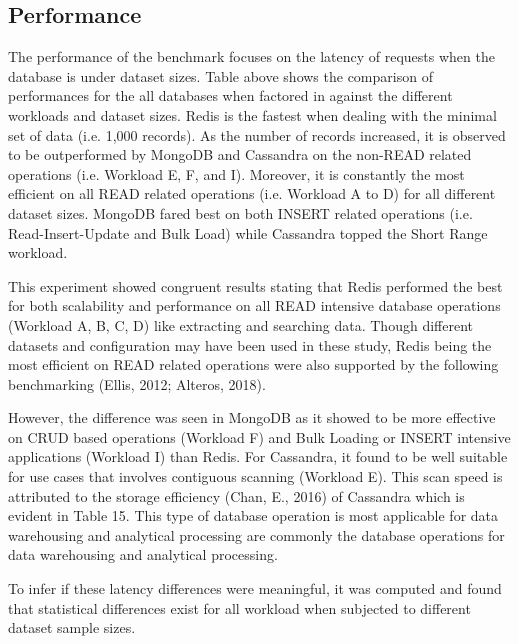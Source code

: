 \documentclass[5p]{elsarticle}
\begin{document}
\subsection{Performance}
The performance of the benchmark focuses on the latency of requests when the database is under dataset sizes.
Table above shows the comparison of performances for the all databases when factored in against the different workloads and dataset sizes. 
Redis is the fastest when dealing with the minimal set of data (i.e. 1,000 records). 
As the number of records increased, it is observed to be outperformed by MongoDB and Cassandra on the non-READ related operations (i.e. Workload E, F, and I).  
Moreover, it is constantly the most efficient on all READ related operations (i.e. Workload A to D) for all different dataset sizes. 
MongoDB fared best on both INSERT related operations (i.e. Read-Insert-Update and Bulk Load) while Cassandra topped the Short Range workload. 

This experiment showed congruent results stating that Redis performed the best for both scalability and performance on all READ intensive database operations (Workload A, B, C, D) like extracting and searching data. 
Though different datasets and configuration may have been used in these study, Redis being the most efficient on READ related operations were also supported by the following benchmarking (Ellis, 2012; Alteros, 2018).

However, the difference was seen in MongoDB as it showed to be more effective on CRUD based operations (Workload F) and Bulk Loading or INSERT intensive applications (Workload I) than Redis. For Cassandra, it found to be well suitable for use cases that involves contiguous scanning (Workload E). This scan speed is attributed to the storage efficiency (Chan, E., 2016) of Cassandra which is evident in Table 15. This type of database operation is most applicable for data warehousing and analytical processing are commonly the database operations for data warehousing and analytical processing. 

To infer if these latency differences were meaningful, it was computed and found that statistical differences 
exist for all workload when subjected to different dataset sample sizes. 
\end{document}
